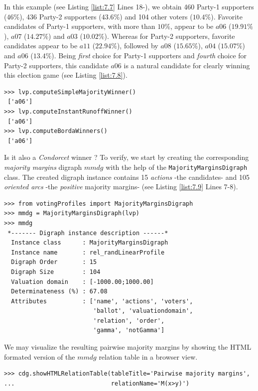In this example (see Listing \ref{list:7.7} Lines 18-), we obtain 460 Party-1 supporters ($46\%$), 436 Party-2 supporters ($43.6\%$) and 104 other voters ($10.4\%$). Favorite candidates of Party-1 supporters, with more than $10\%$, appear to be $a06$ ($19.91\%$), $a07$ ($14.27\%$) and $a03$ ($10.02\%$). Whereas for Party-2 supporters, favorite candidates appear to be $a11$ ($22.94\%$), followed by $a08$ ($15.65\%$), $a04$ ($15.07\%$) and $a06$ ($13.4\%$). Being \emph{first} choice for Party-1 supporters and \emph{fourth} choice for Party-2 supporters, this candidate $a06$ is a natural candidate for clearly winning this election game (see Listing \ref{list:7.8}).

\begin{lstlisting}[caption={The uninominal and \emph{Borda} election winner},label=list:7.8,basicstyle=\footnotesize]
>>> lvp.computeSimpleMajorityWinner()
 ['a06']
>>> lvp.computeInstantRunoffWinner()
 ['a06']  
>>> lvp.computeBordaWinners()
 ['a06']
\end{lstlisting}

Is it also a \emph{Condorcet} winner ? To verify, we start by creating the corresponding \emph{majority margins} digraph $mmdg$ with the help of the \texttt{MajorityMarginsDigraph} class. The created digraph instance contains 15 \emph{actions} -the candidates- and 105 \emph{oriented arcs} -the \emph{positive} majority margins- (see Listing \ref{list:7.9} Lines 7-8).

\begin{lstlisting}[caption={A majority margins digraph constructed from a linear voting profile},label=list:7.9,basicstyle=\footnotesize]
>>> from votingProfiles import MajorityMarginsDigraph
>>> mmdg = MajorityMarginsDigraph(lvp)
>>> mmdg
 *------- Digraph instance description ------*
  Instance class      : MajorityMarginsDigraph
  Instance name       : rel_randLinearProfile
  Digraph Order       : 15
  Digraph Size        : 104
  Valuation domain    : [-1000.00;1000.00]
  Determinateness (%) : 67.08
  Attributes          : ['name', 'actions', 'voters',
                         'ballot', 'valuationdomain',
                         'relation', 'order',
                         'gamma', 'notGamma']
\end{lstlisting}

We may visualize the resulting pairwise majority margins by showing the HTML formated version of the $mmdg$ relation table in a browser view.

\begin{lstlisting}[basicstyle=\footnotesize]
>>> cdg.showHTMLRelationTable(tableTitle='Pairwise majority margins',
...                           relationName='M(x>y)')
\end{lstlisting}


